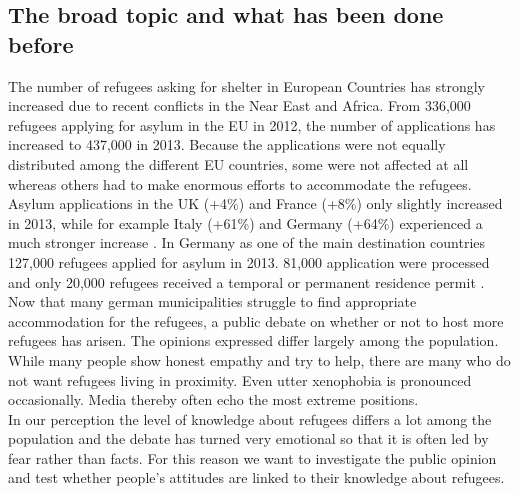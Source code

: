 \documentclass{article}
\begin{document}
\subsection{The broad topic and what has been done before}

The number of refugees asking for shelter in European Countries has strongly increased due to recent conflicts in the Near East and Africa.
From 336,000 refugees applying for asylum in the EU in 2012, the number of applications has increased to 437,000 in 2013. Because the applications were not equally distributed among the different EU countries, some were not affected at all whereas others had to make enormous efforts to accommodate the refugees. Asylum applications in the UK (+4\%) and France (+8\%) only slightly increased in 2013, while for example Italy (+61\%) and Germany (+64\%) experienced a much stronger increase \citep{BAMF2014}. In Germany as one of the main destination countries 127,000 refugees applied for asylum in 2013. 81,000 application were processed and only 20,000 refugees received a temporal or permanent residence permit \citep{BAMF2013}.
Now that many german municipalities struggle to find appropriate accommodation for the refugees, a public debate on whether or not to host more refugees has arisen. The opinions expressed differ largely among the population. While many people show honest empathy and try to help, there are many who do not want refugees living in proximity. Even utter xenophobia is pronounced occasionally. Media thereby often echo the most extreme positions.\\
In our perception the level of knowledge about refugees differs a lot among the population and the debate has turned very emotional so that it is often led by fear rather than facts. For this reason we want to investigate the public opinion and test whether people's attitudes are linked to their knowledge about refugees.
\end{document}
